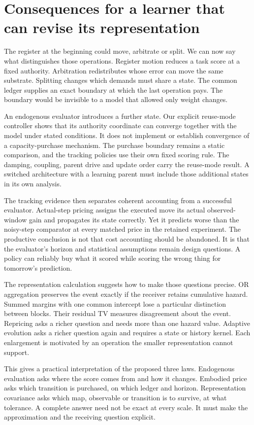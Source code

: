 \section{Consequences for a learner that can revise its representation}
\label{sec:yba-discussion}

The register at the beginning could move, arbitrate or split. We can now say what distinguishes those operations. Register motion reduces a task score at a fixed authority. Arbitration redistributes whose error can move the same substrate. Splitting changes which demands must share a state. The common ledger supplies an exact boundary at which the last operation pays. The boundary would be invisible to a model that allowed only weight changes.

An endogenous evaluator introduces a further state. Our explicit reuse-mode controller shows that its authority coordinate can converge together with the model under stated conditions. It does not implement or establish convergence of a capacity-purchase mechanism. The purchase boundary remains a static comparison, and the tracking policies use their own fixed scoring rule. The damping, coupling, parent drive and update order carry the reuse-mode result. A switched architecture with a learning parent must include those additional states in its own analysis.

The tracking evidence then separates coherent accounting from a successful evaluator. Actual-step pricing assigns the executed move its actual observed-window gain and propagates its state correctly. Yet it predicts worse than the noisy-step comparator at every matched price in the retained experiment. The productive conclusion is not that cost accounting should be abandoned. It is that the evaluator's horizon and statistical assumptions remain design questions. A policy can reliably buy what it scored while scoring the wrong thing for tomorrow's prediction.

The representation calculation suggests how to make those questions precise. OR aggregation preserves the event exactly if the receiver retains cumulative hazard. Summed margins with one common intercept lose a particular distinction between blocks. Their residual TV measures disagreement about the event. Repricing asks a richer question and needs more than one hazard value. Adaptive evolution asks a richer question again and requires a state or history kernel. Each enlargement is motivated by an operation the smaller representation cannot support.

This gives a practical interpretation of the proposed three laws. Endogenous evaluation asks where the score comes from and how it changes. Embodied price asks which transition is purchased, on which ledger and horizon. Representation covariance asks which map, observable or transition is to survive, at what tolerance. A complete answer need not be exact at every scale. It must make the approximation and the receiving question explicit.

